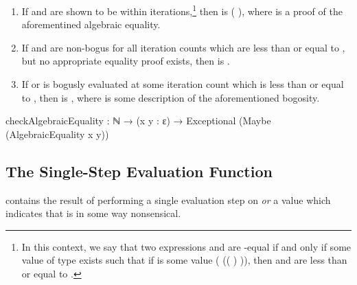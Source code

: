 \documentclass{report}
\begin{document}
\begin{enumerate}
  \item If  and  are shown to be  within  iterations,\footnote{In this context, we say that two  expressions  and  are -equal if and only if some value  of type    exists such that if  is some value  \AgdaSymbol( \AgdaSymbol(\AgdaSymbol( \AgdaOperator{\AgdaInductiveConstructor{,}} \AgdaSymbol) \AgdaOperator{\AgdaInductiveConstructor{,}} \AgdaSymbol)\AgdaSymbol), then  and  are less than or equal to .}  then     is  \AgdaSymbol( \AgdaSymbol), where  is a proof of the aforementined algebraic equality.\label{enum:eqCheck-just-if-equal}
  \item If  and  are non-bogus for all iteration counts which are less than or equal to , but no appropriate equality proof exists, then     is  .\label{enum:eqCheck-nothing-if-not-equal}
  \item If  or  is bogusly evaluated at some iteration count which is less than or equal to , then     is  , where  is some description of the aforementioned bogosity.\label{enum:eqCheck-inj1-if-bogus}
\end{enumerate}

\begin{code}
checkAlgebraicEquality :
  ℕ → (x y : ε) → Exceptional (Maybe (AlgebraicEquality x y))
\end{code}

\subsection{The Single-Step Evaluation Function}
  contains the result of performing a single evaluation step on  \emph{or} a value which indicates that  is in some way nonsensical.
\end{document}
